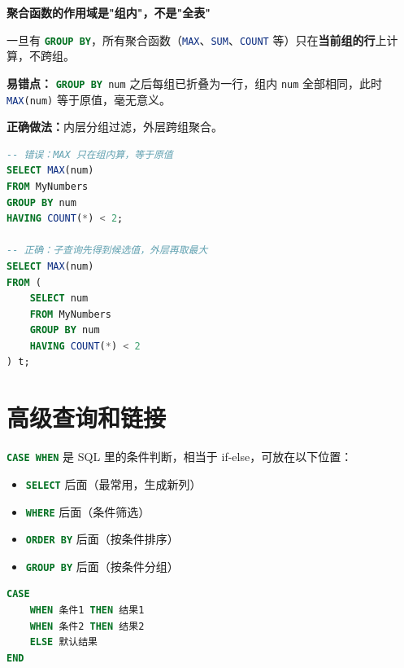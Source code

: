 \begin{homework}[619 | 排序和分组 第3题]
\begin{note}
\textbf{聚合函数的作用域是"组内"，不是"全表"}

一旦有 \lstinline[language=SQL]|GROUP BY|，所有聚合函数（\lstinline[language=SQL]|MAX|、\lstinline[language=SQL]|SUM|、\lstinline[language=SQL]|COUNT| 等）只在\textbf{当前组的行}上计算，不跨组。

\textbf{易错点：} \lstinline[language=SQL]|GROUP BY num| 之后每组已折叠为一行，组内 \lstinline[language=SQL]|num| 全部相同，此时 \lstinline[language=SQL]|MAX(num)| 等于原值，毫无意义。

\textbf{正确做法：}内层分组过滤，外层跨组聚合。

\begin{lstlisting}[language=SQL, backgroundcolor=\color{white}, frame=single]
-- 错误：MAX 只在组内算，等于原值
SELECT MAX(num)
FROM MyNumbers
GROUP BY num
HAVING COUNT(*) < 2;

-- 正确：子查询先得到候选值，外层再取最大
SELECT MAX(num)
FROM (
    SELECT num
    FROM MyNumbers
    GROUP BY num
    HAVING COUNT(*) < 2
) t;
\end{lstlisting}
\end{note}
\end{homework}

\section{高级查询和链接}
\begin{note}
\lstinline[language=SQL]|CASE WHEN| 是 SQL 里的条件判断，相当于 if-else，可放在以下位置：
\begin{itemize}
    \item \lstinline[language=SQL]|SELECT| 后面（最常用，生成新列）
    \item \lstinline[language=SQL]|WHERE| 后面（条件筛选）
    \item \lstinline[language=SQL]|ORDER BY| 后面（按条件排序）
    \item \lstinline[language=SQL]|GROUP BY| 后面（按条件分组）
\end{itemize}
\begin{lstlisting}[language=SQL, backgroundcolor=\color{white}, frame=single]
CASE
    WHEN 条件1 THEN 结果1
    WHEN 条件2 THEN 结果2
    ELSE 默认结果
END
\end{lstlisting}

\end{note}


